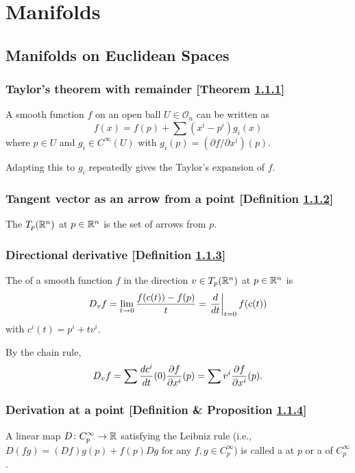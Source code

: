 \section{Manifolds\cite{loring}}
\subsection{Manifolds on Euclidean Spaces}
\subsubsection{Taylor's theorem with remainder [Theorem \ref{taylors-theorem-with-remainder}]}\label{taylors-theorem-with-remainder}
A smooth function $f$ on an open ball $U \in \mathcal{O}_n$ can be written as
\[
f(x) = f(p) + \sum (x^i - p^i) g_i(x)
\]
where $p \in U$ and $g_i \in C^\infty (U)$ with $g_i(p) = (\partial f / \partial x^i)(p)$.

Adapting this to $g_i$ repeatedly gives the Taylor's expansion of $f$.

\subsubsection{Tangent vector as an arrow from a point [Definition \ref{tangent-vector-as-an-arrow-from-a-point}]}\label{tangent-vector-as-an-arrow-from-a-point}
The  $T_p (\mathbb{R}^n)$ at $p \in \mathbb{R}^n$ is the set of arrows from $p$.

\subsubsection{Directional derivative [Definition \ref{directional-derivative}]}\label{directional-derivative}
The  of a smooth function $f$ in the direction $v \in T_p(\mathbb{R}^n)$ at $p \in \mathbb{R}^n$ is
\[
D_v f = \lim_{t \to 0} \frac{f(c(t)) - f(p)}{t} = \left. \frac{d}{dt}\right|_{t=0} f(c(t))
\]
with $c^i(t) = p^i + tv^i$.

By the chain rule,
\[
D_v f = \sum \frac{dc^i}{dt}(0)\frac{\partial f}{\partial x^i}(p) = \sum v^i \frac{\partial f}{\partial x^i}(p).
\]

\subsubsection{Derivation at a point [Definition \& Proposition \ref{derivation-at-a-point}]}\label{derivation-at-a-point}
A linear map $D \colon C_p^\infty \to \mathbb{R}$ satisfying the Leibniz rule (i.e., $D(fg) = (D f)g(p) + f(p)D g$ for any $f, g \in C_p^\infty$) is called a  at $p$ or a  of $C_p^\infty$.


